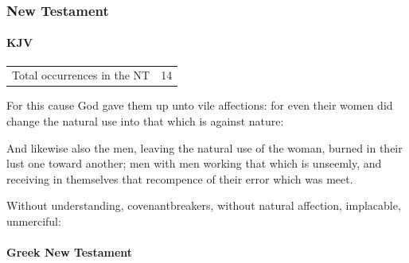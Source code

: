 			
		
		
	\subsubsection{New Testament} %
		\label{NATURAL-NT}
	
		\paragraph{KJV}
			\label{NATURAL-NT-KJV}
			
	
			\begin{tabular}{ll}
				Total occurrences in the NT & 14
			\end{tabular}
			
			\begin{compactdesc}
				\item[{\hyperref[ROMANS-1-26]{Romans 1:26}}] For this cause God gave them up unto vile affections: for even their women did change the natural use into that which is against nature:
				\item[{\hyperref[ROMANS-1-27]{Romans 1:27}}] And likewise also the men, leaving the natural use of the woman, burned in their lust one toward another; men with men working that which is unseemly, and receiving in themselves that recompence of their error which was meet.
				\item[{\hyperref[ROMANS-1-31]{Romans 1:31}}] Without understanding, covenantbreakers, without natural affection, implacable, unmerciful:
			\end{compactdesc}
			
		\paragraph{Greek New Testament} %
			\label{NATURAL-GREEK}
		
